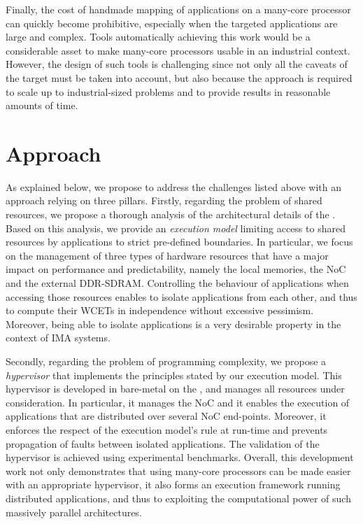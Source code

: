 \documentclass[main.tex]{subfiles}
\begin{document}
Finally, the cost of handmade mapping of applications on a many-core processor
can quickly become prohibitive, especially when the targeted applications are
large and complex. Tools automatically achieving this work would be a
considerable asset to make many-core processors usable in an industrial
context. However, the design of such tools is challenging since not only all
the caveats of the target must be taken into account, but also because the
approach is required to scale up to industrial-sized problems and to provide
results in reasonable amounts of time.\\


\section{Approach}
As explained below, we propose to address the challenges listed above with an
approach relying on three pillars. Firstly, regarding the problem of shared
resources, we propose a thorough analysis of the architectural details of the
\mppalong. Based on this analysis, we provide an \emph{execution model}
limiting access to shared resources by applications to strict pre-defined
boundaries. In particular, we focus on the management of three types of
hardware resources that have a major impact on performance and predictability,
namely the local memories, the NoC and the external DDR-SDRAM. Controlling the
behaviour of applications when accessing those resources enables to isolate
applications from each other, and thus to compute their WCETs in independence
without excessive pessimism. Moreover, being able to isolate applications is a
very desirable property in the context of IMA systems.

Secondly, regarding the problem of programming complexity, we propose a
\emph{hypervisor} that implements the principles stated by our execution model.
This hypervisor is developed in bare-metal on the \mppalong, and manages all
resources under consideration. In particular, it manages the NoC and it enables
the execution of applications that are distributed over several NoC end-points.
Moreover, it enforces the respect of the execution model's rule at run-time and
prevents propagation of faults between isolated applications. The validation of
the hypervisor is achieved using experimental benchmarks. Overall, this
development work not only demonstrates that using many-core processors can be
made easier with an appropriate hypervisor, it also forms an execution
framework running distributed applications, and thus to exploiting the
computational power of such massively parallel architectures.
\end{document}
